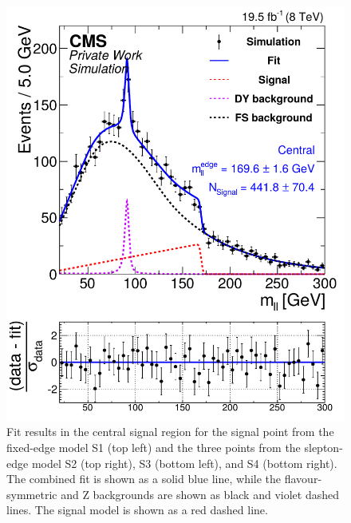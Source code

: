 \begin{figure}[hbp]
\begin{minipage}[t]{0.49\textwidth}
    \includegraphics[width=\textwidth]{plots/results/fit/mcFits/fit2012_ETHTriangle_SignalInclusive_Combined_Full2012_ETHTriangle_MC_SignalInjected_slepton_450_275_100_Central.pdf}
  \end{minipage}
  \caption{Fit results in the central signal region for the signal point from the fixed-edge model S1 (top left) and the three points from the slepton-edge model S2 (top right), S3 (bottom left), and S4 (bottom right). The combined fit is shown as a solid blue line, while the flavour-symmetric and Z backgrounds are shown as black and violet dashed lines. The signal model is shown as a red dashed line.}
  \label{fig:mc:signalInjection}
\end{figure}




